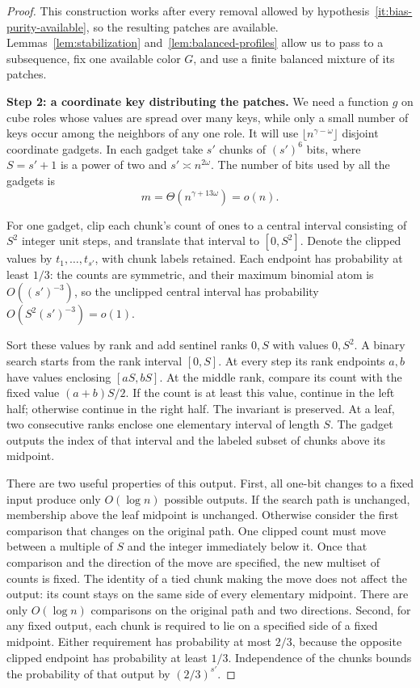 \begin{proof}
This construction works after every removal allowed by
hypothesis~\ref{it:bias-purity-available}, so the resulting patches are
available. Lemmas~\ref{lem:stabilization} and~\ref{lem:balanced-profiles}
allow us to pass to a subsequence, fix one available color \(G\), and use
a finite balanced mixture of its patches.

\noindent\textbf{Step 2: a coordinate key distributing the patches.}\quad
We need a function \(g\) on cube roles whose values are spread over many
keys, while only a small number of keys occur among the neighbors of any
one role. It will use \(\lfloor n^{\gamma-\omega}\rfloor\) disjoint
coordinate gadgets. In each gadget take \(s'\) chunks of \((s')^6\) bits,
where \(S=s'+1\) is a power of two and \(s'\asymp n^{2\omega}\).
The number of bits used by all the gadgets is
\[
 m=\Theta(n^{\gamma+13\omega})=o(n).
\]

For one gadget, clip each chunk's count of ones to a central interval
consisting of \(S^2\) integer unit steps, and translate that interval to
\([0,S^2]\). Denote the clipped values by \(t_1,\ldots,t_{s'}\), with
chunk labels retained. Each endpoint has probability at least \(1/3\):
the counts are symmetric, and their maximum binomial atom is
\(O((s')^{-3})\), so the unclipped central interval has probability
\(O(S^2(s')^{-3})=o(1)\).

Sort these values by rank and add sentinel ranks \(0,S\) with values
\(0,S^2\). A binary search starts from the rank interval \([0,S]\).
At every step its rank endpoints \(a,b\) have values enclosing
\([aS,bS]\). At the middle rank, compare its count with the fixed value
\((a+b)S/2\). If the count is at least this value, continue in the left
half; otherwise continue in the right half. The invariant is preserved.
At a leaf, two consecutive ranks enclose one elementary interval of
length \(S\). The gadget outputs the index of that interval and the
labeled subset of chunks above its midpoint.

There are two useful properties of this output. First, all one-bit
changes to a fixed input produce only \(O(\log n)\) possible outputs.
If the search path is unchanged, membership above the leaf midpoint is
unchanged. Otherwise consider the first comparison that changes on the
original path. One clipped count must move between a multiple of \(S\)
and the integer immediately below it. Once that comparison and the
direction of the move are specified, the new multiset of counts is fixed.
The identity of a tied chunk making the move does not affect the output:
its count stays on the same side of every elementary midpoint. There are
only \(O(\log n)\) comparisons on the original path and two directions.
Second, for any fixed output, each chunk is required to lie on a specified
side of a fixed midpoint. Either requirement has probability at most
\(2/3\), because the opposite clipped endpoint has probability at least
\(1/3\). Independence of the chunks bounds the probability of that output
by \((2/3)^{s'}\).


\end{proof}
